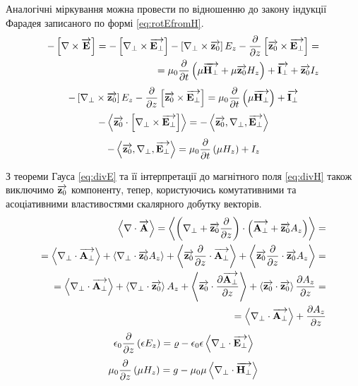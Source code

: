 Аналогічні міркування можна провести по відношенню до закону індукції Фарадея 
записаного по формі \eqref{eq:rotEfromH}.
%
\textcolor{lightgray}{ \begin{equation*} \begin{aligned}
- \left[ \nabla \times \overrightarrow{\mathbf E} \right] = 
- \left[ \nabla_\perp \times \overrightarrow{\mathbf E_\perp} \right] - 
\left[ \nabla_\perp \times \overrightarrow{\mathbf z_0} \right] E_z -
\frac{\partial }{\partial z} \left[ \overrightarrow{\mathbf z_0} \times \overrightarrow{\mathbf E_\perp} \right] = \\
= \mu_0 \frac{\partial }{\partial t} \left( \mu  \overrightarrow{\mathbf H_\perp} + \mu \overrightarrow{\mathbf z_0} H_z \right) + 
\overrightarrow{\mathbf I_\perp} + \overrightarrow{\mathbf z_0} I_z
\end{aligned} \end{equation*} }
%
\begin{equation} \label{eq:rotEt} 
- \left[ \nabla_\perp \times \overrightarrow{\mathbf z_0} \right] E_z -
\frac{\partial }{\partial z} \left[ \overrightarrow{\mathbf z_0} \times \overrightarrow{\mathbf E_\perp} \right] = 
\mu_0 \frac{\partial }{\partial t} \left( \mu  \overrightarrow{\mathbf H_\perp} \right) + \overrightarrow{\mathbf I_\perp}
\end{equation}
%
\textcolor{lightgray}{ \begin{equation*} \begin{aligned}
- \left< \overrightarrow{\mathbf z_0} \cdot \left[ \nabla_\perp \times \overrightarrow{\mathbf E_\perp} \right] \right> = 
- \left< \overrightarrow{\mathbf z_0} , \nabla_\perp , \overrightarrow{\mathbf E_\perp} \right>
\end{aligned} \end{equation*} }
%
\begin{equation} \label{eq:rotEz}
- \left< \overrightarrow{\mathbf z_0} , \nabla_\perp , \overrightarrow{\mathbf E_\perp} \right> =
\mu_0 \frac{\partial }{\partial t} \left(\mu H_z \right) + I_z
\end{equation}

З теореми Гауса \eqref{eq:divE} та її інтерпретації до магнітного поля 
\eqref{eq:divH} також виключимо $ \overrightarrow{\mathbf z_0} $ компоненту, тепер, користуючись 
комутативними та асоціативними властивостями скалярного добутку векторів.
%
\textcolor{lightgray}{ \begin{equation*} \begin{aligned}
\left< \nabla \cdot \overrightarrow{\mathbf A} \right> = \left< \left( \nabla_\perp + \overrightarrow{\mathbf z_0} \frac{\partial }{\partial z} \right) \cdot \left( \overrightarrow{\mathbf A_\perp} + \overrightarrow{\mathbf z_0} A_z \right) \right> = \\
= \left< \nabla_\perp \cdot \overrightarrow{\mathbf A_\perp} \right> + 
\left< \nabla_\perp \cdot \overrightarrow{\mathbf z_0} A_z \right>  +
\left< \overrightarrow{\mathbf z_0} \frac{\partial }{\partial z} \cdot \overrightarrow{\mathbf A_\perp} \right> +
\left< \overrightarrow{\mathbf z_0} \frac{\partial }{\partial z} \cdot \overrightarrow{\mathbf z_0} A_z \right> = \\
= \left< \nabla_\perp \cdot \overrightarrow{\mathbf A_\perp} \right> +
\left< \nabla_\perp \cdot \overrightarrow{\mathbf z_0} \right> A_z +
\left< \overrightarrow{\mathbf z_0} \cdot \frac{\partial \overrightarrow{\mathbf A_\perp}}{\partial z} \right> +
\left< \overrightarrow{\mathbf z_0} \cdot \overrightarrow{\mathbf z_0} \right> \frac{\partial A_z}{\partial z} = \\
= \left< \nabla_\perp \cdot \overrightarrow{\mathbf A_\perp} \right> + \frac{\partial A_z}{\partial z}
\end{aligned} \end{equation*} }
%
\begin{equation} \label{eq:divEt} 
\epsilon_0 \frac{\partial }{\partial z} \left( \epsilon E_z \right) = 
\varrho - \epsilon_0 \epsilon \left< \nabla_\perp \cdot \overrightarrow{\mathbf E_\perp} \right>
\end{equation}
%
\begin{equation} \label{eq:divHt}
\mu_0 \frac{\partial }{\partial z} \left( \mu H_z \right) = 
g - \mu_0 \mu \left< \nabla_\perp \cdot \overrightarrow{\mathbf H_\perp} \right>
\end{equation}

